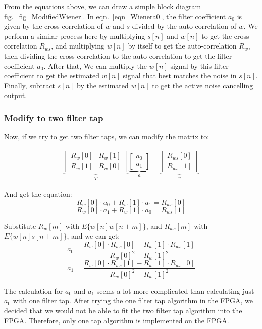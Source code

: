 From the equations above, we can draw a simple block diagram fig.~\ref{fig_ModifiedWiener}.  In eqn.~\ref{eqn_Wienera0}, the filter coefficient $a_0$ is given by the cross-correlation of $w$ and $s$ divided by the auto-correlation of $w$.  We perform a similar process here by multiplying $s[n]$ and $w[n]$ to get the cross-correlation $R_{ws}$, and multiplying $w[n]$ by itself to get the auto-correlation $R_w$, then dividing the cross-correlation to the auto-correlation to get the filter coefficient $a_0$.  After that, We can multiply the $w[n]$ signal by this filter coefficient to get the estimated $w[n]$ signal that best matches the noise in $s[n]$.  Finally, subtract $s[n]$ by the estimated $w[n]$ to get the active noise cancelling output.

\subsubsection{Modify to two filter tap}  

Now, if we try to get two filter taps, we can modify the matrix to:

\begin{gather}
\underbrace{
    \begin{bmatrix}
    R_w[0] & R_w[1]\\
    R_w[1] & R_w[0]
    \end{bmatrix}
}_{T}
\underbrace{
    \begin{bmatrix}
    a_0 \\
    a_1
    \end{bmatrix}
}_{a}
=
\underbrace{
    \begin{bmatrix}
    R_{ws}[0] \\
    R_{ws}[1]
    \end{bmatrix}
}_{v}
\end{gather}

And get the equation:
$$R_w[0] \cdot a_0 + R_w[1] \cdot a_1 = R_{ws}[0]$$
$$R_w[0] \cdot a_1 + R_w[1] \cdot a_0 = R_{ws}[1]$$

Substitute $R_w[m]$ with $E\{w[n]w[n+m]\}$, and $R_{ws}[m]$ with $E\{w[n]s[n+m]\}$, and we can get:
$$a_0 = \frac{R_w[0] \cdot R_{ws}[0] - R_w[1] \cdot R_{ws}[1]}{R_w[0]^2 - R_w[1]^2}$$
$$a_1 = \frac{R_w[0] \cdot R_{ws}[1] - R_w[1] \cdot R_{ws}[0]}{R_w[0]^2 - R_w[1]^2}$$

The calculation for $a_0$ and $a_1$ seems a lot more complicated than calculating just $a_0$ with one filter tap.  After trying the one filter tap algorithm in the FPGA, we decided that we would not be able to fit the two filter tap algorithm into the FPGA.  Therefore, only one tap algorithm is implemented on the FPGA.

